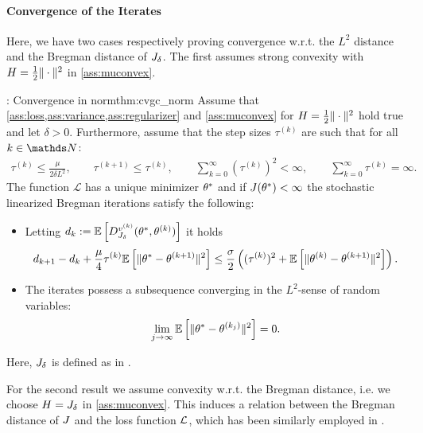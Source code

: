 \paragraph{Convergence of the Iterates}
Here, we have two cases respectively proving convergence w.r.t. the $L^2$ distance and the Bregman distance of $J_\delta$. The first assumes strong convexity with $H=\frac{1}{2}\|\cdot\|^2$ in \cref{ass:muconvex}.
%
%
\begin{theorem}{\cite[Th. 6]{bungert2022bregman}: Convergence in norm}{thm:cvgc_norm}
Assume that \cref{ass:loss,ass:variance,ass:regularizer} and \cref{ass:muconvex} for $H=\frac{1}{2}\|\cdot\|^2$ hold true and let $\delta>0$.
Furthermore, assume that the step sizes $\tau^{(k)}$ are such that for all $k\in\N$:
\begin{align*}
    {\tau^{(k)}\leq \frac{\mu}{2\delta L^2}},\qquad
    \tau^{(k+1)} \leq \tau^{(k)}, \qquad
    \sum_{k=0}^\infty (\tau^{(k)})^2 < \infty, \qquad
    \sum_{k=0}^\infty \tau^{(k)} = \infty.
\end{align*}
The function $\mathcal{L}$ has a unique minimizer $\theta^*$ and if $J(\theta^*)<\infty$ the stochastic linearized Bregman iterations  satisfy the following:
\begin{itemize}
    \item Letting $d_k:=\mathbb{E}\left[D_{J_\delta}^{v^{(k)}}(\theta^*,\theta^{(k)})\right]$ it holds
    \begin{align}\label{ineq:decay_bregman_distance}
        d_{k+1} - d_k + \frac{\mu}{4}\tau^{(k)}\mathbb{E}\left[\|\theta^*-\theta^{(k+1)}\|^2\right]
        \leq  \frac{\sigma}{2}\left((\tau^{(k)})^2 +\mathbb{E}\left[\|\theta^{(k)} - \theta^{(k+1)}\|^2\right]\right).
    \end{align}
    \item The iterates possess a subsequence converging in the $L^2$-sense of random variables: 
    \begin{align}
        \lim_{j\to\infty}\mathbb{E}\left[\|\theta^*-\theta^{(k_j)}\|^2\right] = 0.
    \end{align}
\end{itemize}
{Here, $J_\delta$ is defined as in .}
\end{theorem}
%
%
For the second result we assume convexity w.r.t. the Bregman distance, i.e. we choose $H=J_{\delta}$ in \cref{ass:muconvex}. This induces a relation between the Bregman distance of $J$ and the loss function $\mathcal{L}$, which has been similarly employed in \cite{dragomir2021fast}.
